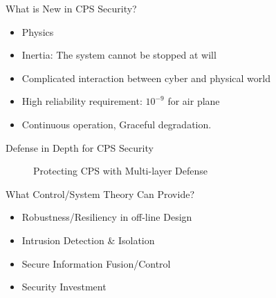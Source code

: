 \documentclass[10pt]{beamer}
\begin{document}
\begin{frame}{What is New in CPS Security?}
  \begin{itemize}
    \item Physics
    \item Inertia: The system cannot be stopped at will
    \item Complicated interaction between cyber and physical world
    \item High reliability requirement: $10^{-9}$ for air plane
    \item Continuous operation, Graceful degradation.
  \end{itemize}
\end{frame}

\begin{frame}{Defense in Depth for CPS Security}
  \begin{figure}[ht]
    \centering
    \caption{Protecting CPS with Multi-layer Defense}
  \end{figure}
\end{frame}

\begin{frame}{What Control/System Theory Can Provide?}
  \begin{itemize}
    \item Robustness/Resiliency in off-line Design
    \item Intrusion Detection \& Isolation
    \item Secure Information Fusion/Control
    \item Security Investment
  \end{itemize}
\end{frame}
\end{document}
